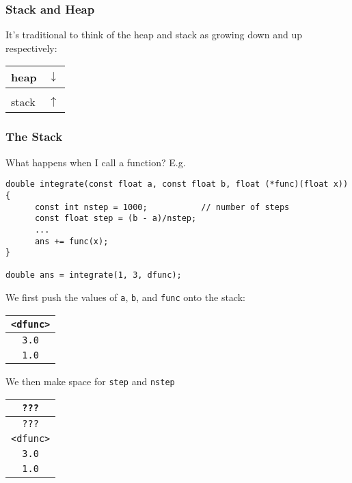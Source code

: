 \documentclass[10pt, t]{beamer}
\begin{document}
\begin{frame}
\frametitle{Stack and Heap}
\label{sec-5_1_5}


It's traditional to think of the heap and stack as growing down and up respectively:


\begin{center}
\begin{tabular}{|l|l|}
\hline
 heap   &  $\downarrow$  \\
\hline
 \null  &                \\
\hline
 stack  &  $\uparrow$    \\
\hline
\end{tabular}
\end{center}
\end{frame}
\begin{frame}[fragile]
\frametitle{The Stack}
\label{sec-5_1_6}


What happens when I call a function? E.g.
\begin{verbatim}
double integrate(const float a, const float b, float (*func)(float x)) {
      const int nstep = 1000;           // number of steps
      const float step = (b - a)/nstep;
      ...
      ans += func(x);
}

double ans = integrate(1, 3, dfunc);
\end{verbatim}
\pause
We first push the values of \texttt{a}, \texttt{b}, and \texttt{func} onto the stack:


\begin{center}
\begin{tabular}{|c|}
\hline
 \texttt{<dfunc>}  \\
\hline
 \texttt{3.0}      \\
\hline
 \texttt{1.0}      \\
\hline
\hline
\end{tabular}
\end{center}



\pause
We then make space for \texttt{step} and \texttt{nstep}


\begin{center}
\begin{tabular}{|c|}
\hline
 \texttt{???}      \\
\hline
 \texttt{???}      \\
\hline
 \texttt{<dfunc>}  \\
\hline
 \texttt{3.0}      \\
\hline
 \texttt{1.0}      \\
\hline
\hline
\end{tabular}
\end{center}
\end{frame}
\end{document}
